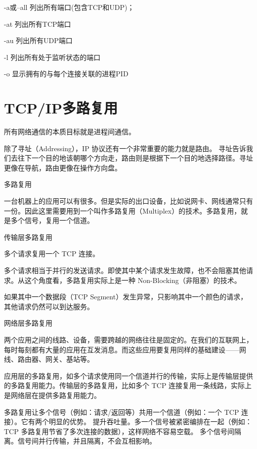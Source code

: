 \begin{framed}

    -a或–all 列出所有端口(包含TCP和UDP)；

    -at 列出所有TCP端口

    -au 列出所有UDP端口

    -l 列出所有处于监听状态的端口

    -o 显示拥有的与每个连接关联的进程PID

\end{framed}

\section{TCP/IP多路复用}

所有网络通信的本质目标就是进程间通信。

除了寻址（Addressing），IP 协议还有一个非常重要的能力就是路由。
 寻址告诉我们去往下一个目的地该朝哪个方向走，路由则是根据下一个目的地选择路径。寻址更像在导航，路由更像在操作方向盘。

多路复用

 一台机器上的应用可以有很多。但是实际的出口设备，比如说网卡、网线通常只有一份。因此这里需要用到一个叫作多路复用（Multiplex）的技术。多路复用，就是多个信号，复用一个信道。

传输层多路复用

 多个请求复用一个 TCP 连接。

多个请求相当于并行的发送请求。即使其中某个请求发生故障，也不会阻塞其他请求。从这个角度看，多路复用实际上是一种 Non-Blocking（非阻塞）的技术。

如果其中一个数据段（TCP Segment）发生异常，只影响其中一个颜色的请求，其他请求仍然可以到达服务。

网络层多路复用

 两个应用之间的线路、设备，需要跨越的网络往往是固定的。在我们的互联网上，每时每刻都有大量的应用在互发消息。而这些应用要复用同样的基础建设——网线、路由器、网关、基站等。

应用层的多路复用，如多个请求使用同一个信道并行的传输，实际上是传输层提供的多路复用能力。传输层的多路复用，比如多个 TCP 连接复用一条线路，实际上是网络层在提供多路复用能力。

多路复用让多个信号（例如：请求/返回等）共用一个信道（例如：一个 TCP 连接）。它有两个明显的优势。
 提升吞吐量。多一个信号被紧密编排在一起（例如：TCP 多路复用节省了多次连接的数据），这样网络不容易空载。
 多个信号间隔离。信号间并行传输，并且隔离，不会互相影响。

